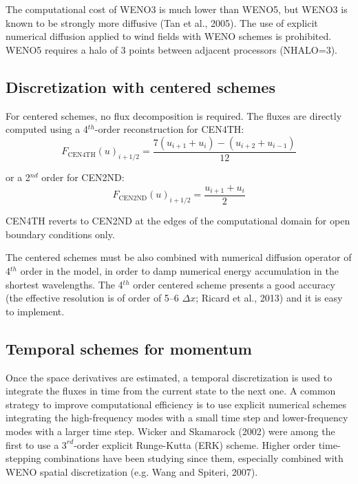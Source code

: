 The computational cost of WENO3 is much lower than WENO5, but WENO3 is known to be strongly more diffusive (Tan et al., 2005). The use of explicit numerical diffusion applied to wind fields with WENO schemes is
prohibited. WENO5 requires a halo of 3 points between adjacent processors (NHALO=3).

\subsection{Discretization with centered schemes}

For centered schemes, no flux decomposition is required. The fluxes are directly computed using a 4$^{th}$-order reconstruction for CEN4TH:
\begin{equation}
F_{\mbox{CEN4TH}}(u)_{i+1/2} = \frac{7(u_{i+1}+u_{i})-(u_{i+2}+u_{i-1})}{12}
\end{equation}

or a 2$^{nd}$ order for CEN2ND:
\begin{equation}
F_{\mbox{CEN2ND}}(u)_{i+1/2} = \frac{u_{i+1}+u_{i}}{2}
\end{equation}

CEN4TH reverts to CEN2ND at the edges of the computational domain for open boundary conditions only.

The centered schemes must be also combined with numerical diffusion operator of 4$^{th}$ order in the model, in order to damp numerical energy accumulation in the shortest wavelengths. 
The 4$^{th}$ order centered scheme presents a good accuracy (the effective resolution is of order of 5--6 $\Delta x$; Ricard et al., 2013) and it is easy to implement.

\subsection{Temporal schemes for momentum}

Once the space derivatives are estimated, a temporal discretization is used to integrate the fluxes in time from the current state to the next one. 
A common strategy to improve computational efficiency is to use explicit numerical schemes integrating the high-frequency modes with a small time step and lower-frequency modes with a larger time step.
Wicker and Skamarock (2002) were among the first to use a $3^{rd}$-order explicit Runge-Kutta (ERK) scheme. Higher order time-stepping combinations have been studying since them, especially combined with WENO spatial discretization (e.g. Wang and Spiteri, 2007).

